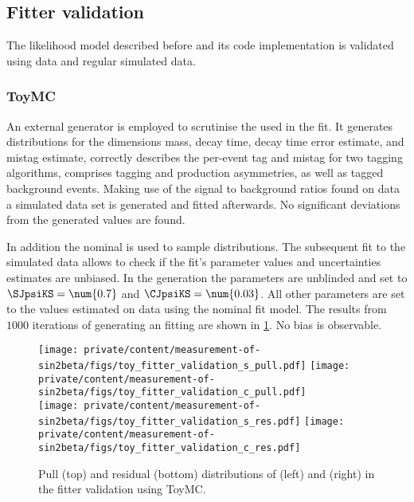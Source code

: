 \subsection{Fitter validation}
\label{sec:measurement_of_sin2beta:likelihood_fit:validation}

The likelihood model described before and its code implementation is validated
using \ToyMC data and regular \MC simulated data.

\subsubsection{\Acl{ToyMC}}
\label{sec:measurement_of_sin2beta:likelihood_fit:validation:toy_mc}

An external \ToyMC generator is employed to scrutinise the \PDF used in the fit.
It generates distributions for the dimensions mass, decay time, decay time error
estimate, and mistag estimate, correctly describes the per-event tag and mistag
for two tagging algorithms, comprises tagging and production asymmetries, as
well as tagged background events. Making use of the signal to background ratios
found on data a simulated data set is generated and fitted afterwards. No
significant deviations from the generated values are found.

In addition the nominal \PDF is used to sample distributions. The subsequent fit
to the simulated data allows to check if the fit's parameter values and
uncertainties estimates are unbiased. In the generation the \CP parameters are
unblinded and set to $\SJpsiKS = \num{0.7}$ and $\CJpsiKS = \num{0.03}$. All
other parameters are set to the values estimated on data using the nominal fit
model. The results from $\num{1000}$ iterations of generating an fitting are
shown in \cref{fig:measurement_of_sin2beta:likelihood_fit:validation:toy_mc}. No
bias is observable.
%
\begin{figure}[!htb]
\centering
\texttt{[image: private/content/measurement-of-sin2beta/figs/toy\_fitter\_validation\_s\_pull.pdf]}
\texttt{[image: private/content/measurement-of-sin2beta/figs/toy\_fitter\_validation\_c\_pull.pdf]}     \\
\texttt{[image: private/content/measurement-of-sin2beta/figs/toy\_fitter\_validation\_s\_res.pdf]}
\texttt{[image: private/content/measurement-of-sin2beta/figs/toy\_fitter\_validation\_c\_res.pdf]}
\caption{Pull (top) and residual (bottom) distributions of \SJpsiKS (left) and
\CJpsiKS (right) in the fitter validation using \ac{ToyMC}.}
\label{fig:measurement_of_sin2beta:likelihood_fit:validation:toy_mc}
\end{figure}

